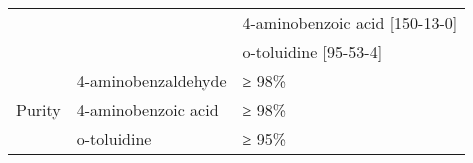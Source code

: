 \begin{landscape}
\begin{table}[]
\begin{tabular}{@{}|l|l|l|@{}}
\multicolumn{2}{|l|}{}                                                     & 4-aminobenzoic acid {[}150-13-0{]}                                                                                                                                                                                                                                                                                                                                                                                    \\ \cmidrule(l){3-3} 
\multicolumn{2}{|l|}{}                                                     & o-toluidine {[}95-53-4{]}                                                                                                                                                                                                                                                                                                                                                                                             \\ \midrule
\multirow{3}{*}{Purity}                              & 4-aminobenzaldehyde & ≥ 98\%                                                                                                                                                                                                                                                                                                                                                                                                                \\ \cmidrule(l){2-3} 
                                                     & 4-aminobenzoic acid & ≥ 98\%                                                                                                                                                                                                                                                                                                                                                                                                                \\ \cmidrule(l){2-3} 
                                                     & o-toluidine         & ≥ 95\%                                                                                                                                                                                                                                                                                                                                                                                                                \\ \midrule

\end{tabular}
\end{table}
\end{landscape}

